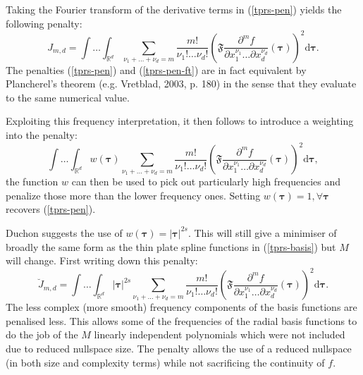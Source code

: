 \documentclass[useAMS,referee, usegraphicx]{biom}
\begin{document}
Taking the Fourier transform of the derivative terms in (\ref{tprs-pen}) yields the following penalty:
\begin{equation}
J_{m,d} = \int \ldots \int_{\mathbb{R}^d} \sum_{\nu_1 + \dots + \nu_d=m} \frac{m!}{\nu_1! \dots \nu_d!} \left ( \mathfrak{F} \frac{\partial^m f}{\partial x_1^{\nu_1} \ldots  \partial x_d^{\nu_d}} \left (  \boldsymbol{\tau}\right ) \right )^2 \text{d} \boldsymbol{\tau}.
\label{tprs-pen-ft}
\end{equation}
The penalties (\ref{tprs-pen}) and (\ref{tprs-pen-ft}) are in fact equivalent by Plancherel's theorem (e.g. Vretblad, 2003, p. 180) in the sense that they evaluate to the same numerical value.

Exploiting this frequency interpretation, it then follows to introduce a weighting into the penalty: 
\begin{equation}
\int \ldots \int_{\mathbb{R}^d} w(\boldsymbol{\tau}) \sum_{\nu_1 + \dots + \nu_d=m} \frac{m!}{\nu_1! \dots \nu_d!} \left ( \mathfrak{F} \frac{\partial^m f}{\partial x_1^{\nu_1} \ldots  \partial x_d^{\nu_d}} \left (\boldsymbol{\tau} \right ) \right )^2 \text{d} \boldsymbol{\tau},
\label{duchon-penalty-general}
\end{equation}
the function $w$ can then be used to pick out particularly high frequencies and penalize those more than the lower frequency ones. Setting $w(\boldsymbol{\tau})=1, \forall \boldsymbol{\tau}$ recovers (\ref{tprs-pen}).

Duchon suggests the use of $w(\boldsymbol{\tau})= \lvert \boldsymbol{\tau} \rvert^{2s}$. This will still give a minimiser of broadly the same form as the thin plate spline functions in (\ref{tprs-basis}) but $M$ will change. First writing down this penalty:
\begin{equation}
\breve{J}_{m,d} = \int \ldots \int_{\mathbb{R}^d} \lvert \boldsymbol{\tau} \rvert^{2s} \sum_{\nu_1 + \dots + \nu_d=m} \frac{m!}{\nu_1! \dots \nu_d!}\left ( \mathfrak{F} \frac{\partial^m f}{\partial x_1^{\nu_1} \ldots  \partial x_d^{\nu_d}} \left (\boldsymbol{\tau} \right ) \right )^2 \text{d} \boldsymbol{\tau}.
\label{duchon-penalty}
\end{equation}
The less complex (more smooth) frequency components of the basis functions are penalised less. This allows some of the frequencies of  the radial basis functions to do the job of the $M$ linearly independent polynomials which were not included due to reduced nullspace size. The penalty allows the use of a reduced nullspace (in both size and complexity terms) while not sacrificing the continuity of $f$. 
\end{document}
